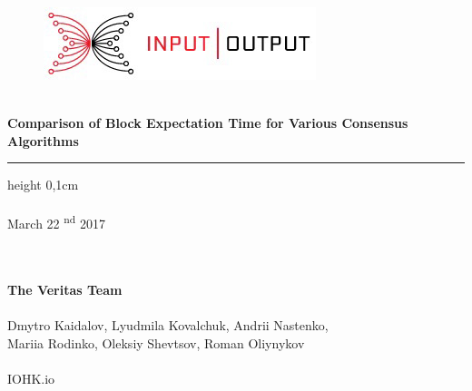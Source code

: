 \documentclass[10pt,a4paper]{article}
\date{}
\numberwithin{equation}{section} %
\theoremstyle{plain}
\theoremstyle{definition}
\theoremstyle{remark}
\begin{document}
	\begin{figure}[htbp]
		\includegraphics  {iohk-share-logo.jpg}
	\end{figure}
	
	\leavevmode \\ 
	{\Large\textbf{ Comparison of Block Expectation Time for Various Consensus Algorithms }}\\[0,5cm]
	\hrule height 0,1cm \leavevmode \\ 
	
	\leavevmode \\ 
	{	\small{March 22 \textsuperscript{nd} 2017}}\\ 
	\leavevmode \\ 
	
	\begin{figure}[htbp]
		
		\begin{subfigure} %
			
		\end{subfigure}
		\hfill
		\begin{subfigure} %
		\end{subfigure}
	\end{figure}
	
	
	
	\leavevmode \\[0,5cm] 
	{\textbf{The Veritas Team}\\ 
		\\ 
		Dmytro Kaidalov, Lyudmila Kovalchuk, Andrii Nastenko,\\ Mariia Rodinko, Oleksiy Shevtsov, Roman Oliynykov
		\\  
		\\ IOHK.io }\\[0,5cm]
	\leavevmode \\[0,5cm]
	
\end{document}
